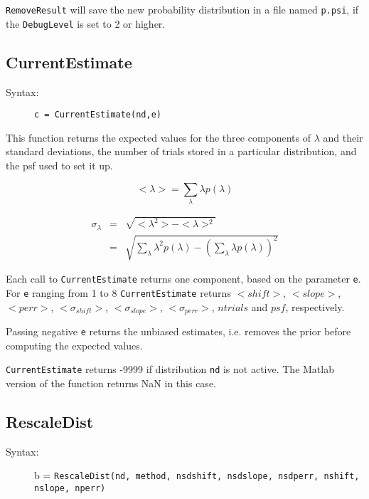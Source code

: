 \documentclass[10pt,letterpaper]{article}
\begin{document}
{\tt RemoveResult} will save the new probability distribution in a file named 
{\tt p.psi}, if the {\tt DebugLevel} is set to 2 or higher.


\subsection{CurrentEstimate}

\begin{description}
\item[Syntax:] {\tt c = CurrentEstimate(nd,e)}
\end{description}

This function returns the expected values for the three components of $\lambda$ and 
their standard deviations, the number of trials stored in a particular 
distribution, and the psf used to set it up.

\begin{equation}
<\lambda> =  \sum_\lambda \lambda p(\lambda)
\end{equation}

\begin{eqnarray}
\sigma_\lambda & = &  \sqrt{ <\lambda^2> - <\lambda>^2} \\
& = & \sqrt{ \sum_\lambda \lambda^2 p(\lambda) - \left( \sum_\lambda \lambda p(\lambda) \right)^2}
\end{eqnarray}

Each call to {\tt CurrentEstimate} returns one component, based on the parameter 
{\tt e}. For {\tt e} ranging from 1 to 8 {\tt CurrentEstimate} returns $<shift>$, $<slope>$, 
$<perr>$, $<\sigma_{shift}>$, $<\sigma_{slope}>$, $<\sigma_{perr}>$, $ntrials$ and $psf$, respectively.

Passing negative {\tt e} returns the unbiased estimates, i.e. removes the prior before computing the
expected values.

{\tt CurrentEstimate} returns -9999 if distribution {\tt nd} is not active. The Matlab version
of the function returns NaN in this case.

\subsection{RescaleDist}

\begin{description}
\item[Syntax:] {b = \tt RescaleDist(nd, method, nsdshift, nsdslope, nsdperr, nshift, nslope, nperr)}
\end{description}
\end{document}
